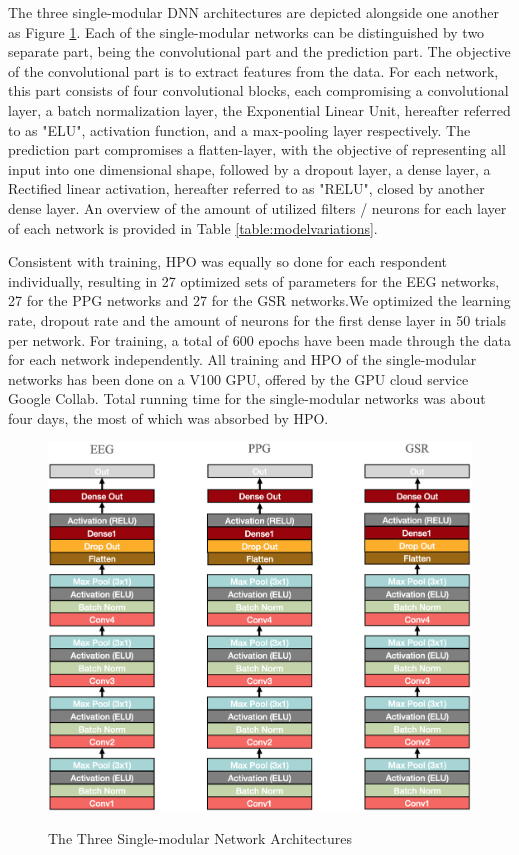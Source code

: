 \documentclass[12pt]{article}
\begin{document}
The three single-modular DNN architectures are depicted alongside one another as Figure \ref{fig:singlearchitecture}. Each of the single-modular networks can be distinguished by two separate part, being the convolutional part and the prediction part.  The objective of the convolutional part is to extract features from the data. For each network, this part consists of four convolutional blocks, each compromising a convolutional layer, a batch normalization layer, the Exponential Linear Unit, hereafter referred to as "ELU", activation function, and a max-pooling layer respectively. The prediction part compromises a flatten-layer,  with the objective of representing all input into one dimensional shape, followed by a dropout layer, a dense layer, a Rectified linear activation, hereafter referred to as "RELU", closed by another dense layer. An overview of the amount of utilized filters / neurons for each layer of each network is provided in Table \ref{table:modelvariations}. 

Consistent with training, HPO was equally so done for each respondent individually, resulting in 27 optimized sets of parameters for the EEG networks, 27 for the PPG networks and 27 for the GSR networks.We optimized the learning rate, dropout rate and the amount of neurons for the first dense layer in 50 trials per network.  For training, a total of 600 epochs have been made through the data for each network independently. All training and HPO of the single-modular networks has been done on a V100 GPU,  offered by the GPU cloud service Google Collab.  Total running time for the single-modular networks was about four days, the most of which was absorbed by HPO. 

\begin{figure}
\caption{The Three Single-modular Network Architectures}
\bigskip
\includegraphics[scale=0.69]{single_model_architecture}
\label{fig:singlearchitecture}
\end{figure}
\restoregeometry
\end{document}
